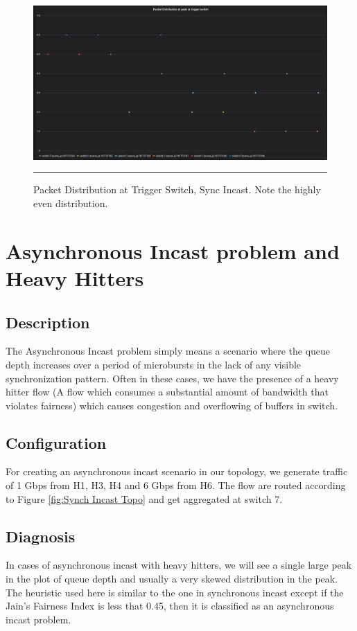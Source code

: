 \begin{figure}[htbp]
	\centering
		\includegraphics[width=1.0\columnwidth]{Figures/distribution_sync.png}
		\rule{35em}{0.5pt}
	\caption[Packet Distribution at Trigger Switch, Sync Incast]{Packet Distribution at Trigger Switch, Sync Incast. Note the highly even distribution.}
	\label{fig:distribution_sync}
\end{figure}

\section{Asynchronous Incast problem and Heavy Hitters}
\subsection{Description}
The Asynchronous Incast problem simply means a scenario where the queue depth increases over a period of microbursts
in the lack of any visible synchronization pattern. Often in these cases, we have the presence of a heavy hitter flow\cite{HH}
(A flow which consumes a substantial amount of bandwidth that violates fairness) which causes congestion and overflowing
of buffers in switch.
\subsection{Configuration}
For creating an asynchronous incast scenario in our topology, we generate traffic of 1 Gbps from H1, H3, H4 and 6 Gbps from H6. The flow are routed
according to Figure \ref{fig:Synch Incast Topo} and get aggregated at switch 7.
\subsection{Diagnosis}
In cases of asynchronous incast with heavy hitters, we will see a single large peak in the plot of queue depth and usually a very
skewed distribution in the peak. The heuristic used here is similar to the one in synchronous incast except if the Jain's 
Fairness Index is less that 0.45, then it is classified as an asynchronous incast problem.
